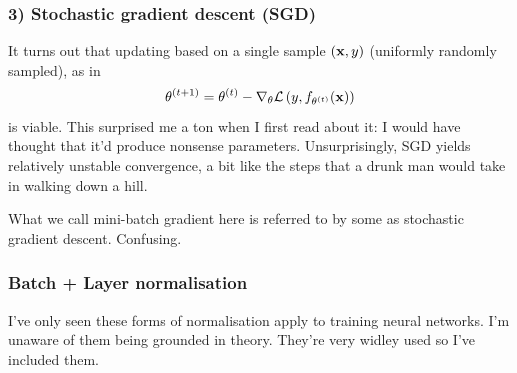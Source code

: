 \documentclass[11pt]{article}
\begin{document}
\subsubsection*{3) Stochastic gradient descent (SGD)}
It turns out that updating based on a single sample $(\mathbf{x},y)$ (uniformly randomly sampled), as in
$$
\theta^{(t+1)}
=
\theta^{(t)}-\nabla_{\theta}\mathcal{L}\left(y,f_{\theta^{(t)}}(\mathbf{x})\right)
$$
is viable. This surprised me a ton when I first read about it: I would have thought that it'd produce nonsense parameters. Unsurprisingly, SGD yields relatively unstable convergence, a bit like the steps that a drunk man would take in walking down a hill.

\begin{tcolorbox}[title={\centering\textbf{Terminology warning}}, colback=myLightBlue, colbacktitle=myDarkBlue, colframe=myDarkBlue, coltitle=white]
    What we call mini-batch gradient here is referred to by some as stochastic gradient descent. Confusing.
\end{tcolorbox}

\subsubsection{Batch + Layer normalisation}
I've only seen these forms of normalisation apply to training neural networks. I'm unaware of them being grounded in theory. They're very widley used so I've included them.
\end{document}
